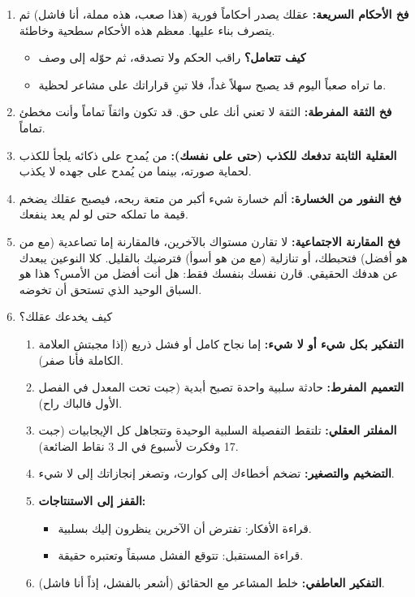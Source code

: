 \documentclass[12pt,a4paper]{book}
\begin{document}
\begin{enumerate}
		\item \textbf{فخ الأحكام السريعة:} عقلك يصدر أحكاماً فورية (هذا صعب، هذه مملة، أنا فاشل) ثم يتصرف بناء عليها. معظم هذه الأحكام سطحية وخاطئة.
		\begin{itemize}
			\item \textbf{كيف تتعامل؟} راقب الحكم ولا تصدقه، ثم حوّله إلى وصف
			\item ما تراه صعباً اليوم قد يصبح سهلاً غداً، فلا تبنِ قراراتك على مشاعر لحظية.
		\end{itemize}
		
		\item \textbf{فخ الثقة المفرطة:} الثقة لا تعني أنك على حق. قد تكون واثقاً تماماً وأنت مخطئ تماماً.
		\item \textbf{العقلية الثابتة تدفعك للكذب (حتى على نفسك):} من يُمدح على ذكائه يلجأ للكذب لحماية صورته، بينما من يُمدح على جهده لا يكذب.
		\item \textbf{فخ النفور من الخسارة:} ألم خسارة شيء أكبر من متعة ربحه، فيصبح عقلك يضخم قيمة ما تملكه حتى لو لم يعد ينفعك.
		\item \textbf{فخ المقارنة الاجتماعية:} لا تقارن مستواك بالآخرين، فالمقارنة إما تصاعدية (مع من هو أفضل) فتحبطك، أو تنازلية (مع من هو أسوأ) فترضيك بالقليل. كلا النوعين يبعدك عن هدفك الحقيقي. قارن نفسك بنفسك فقط: هل أنت أفضل من الأمس؟ هذا هو السباق الوحيد الذي تستحق أن تخوضه.
		\item كيف يخدعك عقلك؟
		\begin{enumerate}
			\item \textbf{التفكير بكل شيء أو لا شيء:} إما نجاح كامل أو فشل ذريع (إذا مجبتش العلامة الكاملة فأنا صفر).
			\item \textbf{التعميم المفرط:} حادثة سلبية واحدة تصبح أبدية (جبت تحت المعدل في الفصل الأول فالباك راح).
			\item \textbf{المفلتر العقلي:} تلتقط التفصيلة السلبية الوحيدة وتتجاهل كل الإيجابيات (جبت 17 وفكرت لأسبوع في الـ 3 نقاط الضائعة).
			\item \textbf{التضخيم والتصغير:} تضخم أخطاءك إلى كوارث، وتصغر إنجازاتك إلى لا شيء.
			\item \textbf{القفز إلى الاستنتاجات:}
			\begin{itemize}
				\item قراءة الأفكار: تفترض أن الآخرين ينظرون إليك بسلبية.
				\item قراءة المستقبل: تتوقع الفشل مسبقاً وتعتبره حقيقة.
			\end{itemize}
			\item \textbf{التفكير العاطفي:} خلط المشاعر مع الحقائق (أشعر بالفشل، إذاً أنا فاشل).

\end{enumerate}
\end{enumerate}
\end{document}
